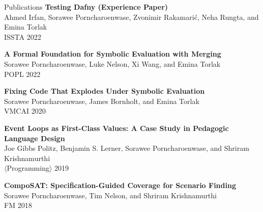 \documentclass{resume} %
\begin{document}
\begin{rSection}{Publications}
  {\bf Testing Dafny (Experience Paper)}\\
  Ahmed Irfan, Sorawee Porncharoenwase, Zvonimir Rakamari\'c, Neha Rungta, and Emina Torlak\\
  ISSTA 2022
  
  {\bf A Formal Foundation for Symbolic Evaluation with Merging}\\
  Sorawee Porncharoenwase, Luke Nelson, Xi Wang, and Emina Torlak\\
  POPL 2022

  {\bf Fixing Code That Explodes Under Symbolic Evaluation}\\
  Sorawee Porncharoenwase, James Bornholt, and Emina Torlak\\
  VMCAI 2020

  {\bf Event Loops as First-Class Values: A Case Study in Pedagogic Language Design}\\
  Joe Gibbs Politz, Benjamin S. Lerner, Sorawee Porncharoenwase, and Shriram Krishnamurthi\\
  $\langle$Programming$\rangle$ 2019

  {\bf CompoSAT: Specification-Guided Coverage for Scenario Finding}\\
  Sorawee Porncharoenwase, Tim Nelson, and Shriram Krishnamurthi\\
  FM 2018
\end{rSection}
\end{document}
